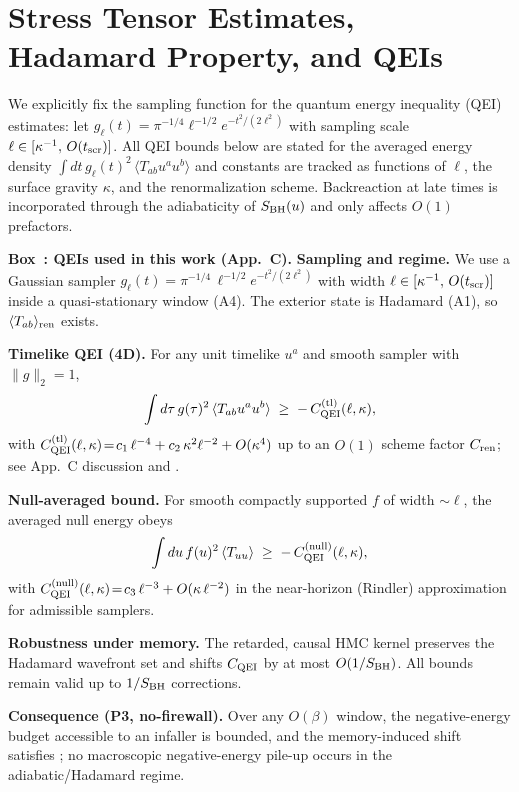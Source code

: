 \documentclass[aps,prd,preprint,onecolumn,superscriptaddress,nofootinbib,longbibliography,floatfix,11pt,showpacs,showkeys]{revtex4-2}
\newcommand{\HMC}{\textsc{HMC}\xspace}
\newcounter{boxedresult}
\newenvironment{boxedresult}[1]{\refstepcounter{boxedresult}\begin{infobox}\noindent\textbf{Box~\theboxedresult: #1.}}{\end{infobox}}
\theoremstyle{plain}
\theoremstyle{definition}
\theoremstyle{remark}
\begin{document}
\section{Stress Tensor Estimates, Hadamard Property, and QEIs}
\label{app:stress_tensor}
\label{app:qei-derivation}
We explicitly fix the sampling function for the quantum energy inequality (QEI) estimates:
let \(g_\ell(t)=\pi^{-1/4}\ell^{-1/2}e^{-t^2/(2\ell^2)}\) with sampling scale \(\ell\in[\kappa^{-1},\,O(t_{\rm scr})]\).
All QEI bounds below are stated for the averaged energy density \(\int dt\,g_\ell(t)^2\,\langle T_{ab}u^a u^b\rangle\)
and constants are tracked as functions of \(\ell\), the surface gravity \(\kappa\), and the renormalization scheme.
Backreaction at late times is incorporated through the adiabaticity of \(S_{\rm BH}(u)\) and only affects \(O(1)\) prefactors.

\begin{boxedresult}{QEIs used in this work (App.~C)}\label{box:qei-appC}
\small
\textbf{Sampling and regime.} We use a Gaussian sampler $g_\ell(t)=\pi^{-1/4}\,\ell^{-1/2}e^{-t^2/(2\ell^2)}$ with width $\ell\in[\kappa^{-1},\,O(t_{\rm scr})]$ inside a quasi-stationary window (A4). The exterior state is Hadamard (A1), so $\langle T_{ab}\rangle_{\rm ren}$ exists.

\textbf{Timelike QEI (4D).} For any unit timelike $u^a$ and smooth sampler with $\|g\|_2=1$,
\[
\int d\tau\, g(\tau)^2\,\langle T_{ab}u^au^b\rangle \;\ge\; -\,C_{\rm QEI}^{\rm(tl)}(\ell,\kappa),
\]
with $C_{\rm QEI}^{\rm(tl)}(\ell,\kappa)\!=\!c_1\,\ell^{-4}+c_2\,\kappa^2\ell^{-2}+O(\kappa^4)$ up to an $O(1)$ scheme factor $C_{\rm ren}$; see App.~C discussion and \cite{Fewster:2012}.

\textbf{Null-averaged bound.} For smooth compactly supported $f$ of width $\sim\ell$, the averaged null energy obeys
\[
\int du\, f(u)^2\,\langle T_{uu}\rangle \;\ge\; -\,C_{\rm QEI}^{\rm(null)}(\ell,\kappa),
\]
with $C_{\rm QEI}^{\rm(null)}(\ell,\kappa)\!=\!c_3\,\ell^{-3}+O(\kappa\,\ell^{-2})$ in the near-horizon (Rindler) approximation for admissible samplers.

\textbf{Robustness under memory.} The retarded, causal \HMC{} kernel preserves the Hadamard wavefront set and shifts $C_{\rm QEI}$ by at most $O(1/S_{\rm BH})$. All bounds remain valid up to $1/S_{\rm BH}$ corrections.

\textbf{Consequence (P3, no-firewall).} Over any $O(\beta)$ window, the negative-energy budget accessible to an infaller is bounded, and the memory-induced shift satisfies ; no macroscopic negative-energy pile-up occurs in the adiabatic/Hadamard regime.
\end{boxedresult}
\end{document}
